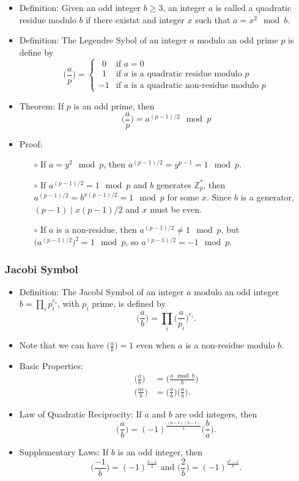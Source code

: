 \documentclass[a4paper]{scrartcl}
\begin{document}
\begin{itemize}
\item Definition: Given an odd integer $b \geq 3$, an integer $a$ is called a quadratic residue modulo $b$ if there existst and integer $x$ such that $a = x^2 \mod b$.
\item Definition: The Legendre Sybol of an integer $a$ modulo an odd prime $p$ is define by
$$\bigg(\frac{a}{p}\bigg) = 
\begin{cases}
\ \ 0 & \text{if $a=0$} \\
\ \ 1 & \text{if $a$ is a quadratic residue modulo $p$} \\
-1 & \text{if $a$ is a quadratic non-residue modulo $p$}
\end{cases}$$
\item Theorem: If $p$ is an odd prime, then 
$$\bigg(\frac{a}{p}\bigg) = a^{(p-1)/2} \mod p$$
\item Proof:
\begin{itemize}
\item [$\circ$] If $a = y^2 \mod p$, then $a^{(p-1)/2} = y^{p-1} = 1 \mod p$.
\item [$\circ$] If $a^{(p-1)/2} = 1 \mod p$ and $b$ generates $\mathbb{Z}_p^*$, then $a^{(p-1)/2} = b^{x(p-1)/2} = 1 \mod p$ for some $x$. Since $b$ is a generator, $(p-1) \mid x(p-1)/2$ and $x$ must be even.
\item [$\circ$] If $a$ is a non-residue, then $a^{(p-1)/2} \neq 1 \mod p$, but $\big(a^{(p-1)/2}\big)^2 = 1 \mod p$, so $a^{(p-1)/2} = -1 \mod p$.
\end{itemize}
\end{itemize}

\subsubsection*{Jacobi Symbol}

\begin{itemize}
\item Definition: The Jacobi Symbol of an integer $a$ modulo an odd integer $b = \prod_i p_i^{e_i}$, with $p_i$ prime, is defined by $$\bigg(\frac{a}{b}\bigg) = \prod_i \bigg(\frac{a}{p_i}\bigg)^{e_i}.$$
\item Note that we can have $\big(\frac{a}{b}\big) = 1$ even when $a$ is a non-residue modulo $b$.
\item Basic Properties:
\begin{align*}
\bigg(\frac{a}{b}\bigg) &= \bigg(\frac{a \mod b}{b}\bigg) \\
\bigg(\frac{ac}{b}\bigg) &= \bigg(\frac{a}{b}\bigg) \bigg(\frac{a}{b}\bigg) .
\end{align*}
\item Law of Quadratic Reciprocity: If $a$ and $b$ are odd integers, then
$$\bigg(\frac{a}{b}\bigg) = (-1)^{\frac{(a-1)(b-1)}{4}} \bigg(\frac{b}{a}\bigg) .$$
\item Supplementary Laws: If $b$ is an odd integer, then
$$\bigg(\frac{-1}{b}\bigg) = (-1)^{\frac{b-1}{2}} \text{\ and \ } \bigg(\frac{2}{b}\bigg) = (-1)^{\frac{b^2-1}{8}} .$$
\end{itemize}
\end{document}
